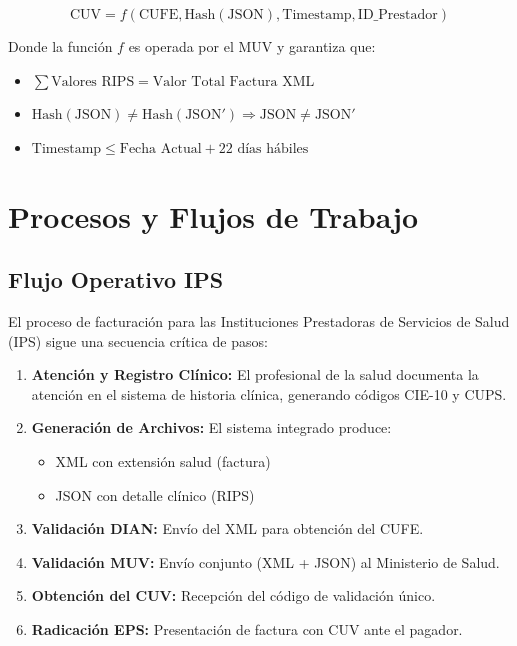 \documentclass[12pt,letterpaper]{report}
\begin{document}
\begin{equation}
\text{CUV} = f(\text{CUFE}, \text{Hash}(\text{JSON}), \text{Timestamp}, \text{ID\_Prestador})
\end{equation}

Donde la función $f$ es operada por el MUV y garantiza que:
\begin{itemize}
    \item $\sum \text{Valores RIPS} = \text{Valor Total Factura XML}$
    \item $\text{Hash}(\text{JSON}) \neq \text{Hash}(\text{JSON}') \Rightarrow \text{JSON} \neq \text{JSON}'$
    \item $\text{Timestamp} \leq \text{Fecha Actual} + 22 \text{ días hábiles}$
\end{itemize}

\section{Procesos y Flujos de Trabajo}

\subsection{Flujo Operativo IPS}

El proceso de facturación para las Instituciones Prestadoras de Servicios de Salud (IPS) sigue una secuencia crítica de pasos:

\begin{enumerate}
    \item \textbf{Atención y Registro Clínico:} El profesional de la salud documenta la atención en el sistema de historia clínica, generando códigos CIE-10 y CUPS.
    
    \item \textbf{Generación de Archivos:} El sistema integrado produce:
    \begin{itemize}
        \item XML con extensión salud (factura)
        \item JSON con detalle clínico (RIPS)
    \end{itemize}
    
    \item \textbf{Validación DIAN:} Envío del XML para obtención del CUFE.
    
    \item \textbf{Validación MUV:} Envío conjunto (XML + JSON) al Ministerio de Salud.
    
    \item \textbf{Obtención del CUV:} Recepción del código de validación único.
    
    \item \textbf{Radicación EPS:} Presentación de factura con CUV ante el pagador.
\end{enumerate}
\end{document}

